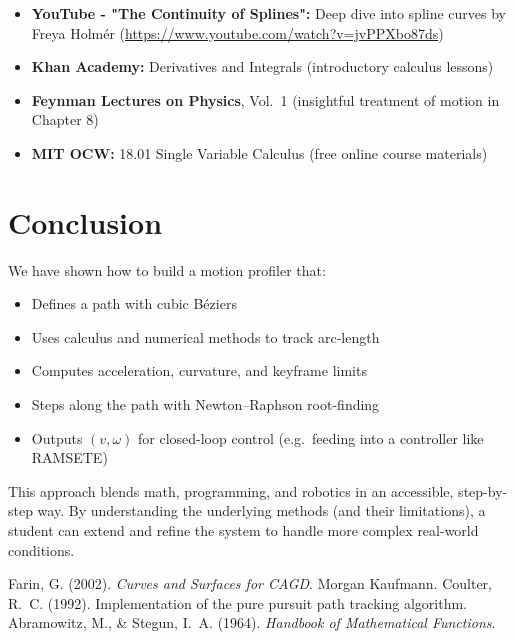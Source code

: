 \documentclass[11pt]{article}
\begin{document}
\begin{itemize}
  \item \textbf{YouTube - "The Continuity of Splines":} Deep dive into spline curves by Freya Holmér (\url{https://www.youtube.com/watch?v=jvPPXbo87ds})
  \item \textbf{Khan Academy:} Derivatives and Integrals (introductory calculus lessons)
  \item \textbf{Feynman Lectures on Physics}, Vol.~1 (insightful treatment of motion in Chapter 8)
  \item \textbf{MIT OCW:} 18.01 Single Variable Calculus (free online course materials)
\end{itemize}

\section{Conclusion}

We have shown how to build a motion profiler that:
\begin{itemize}
  \item Defines a path with cubic Béziers
  \item Uses calculus and numerical methods to track arc‐length
  \item Computes acceleration, curvature, and keyframe limits
  \item Steps along the path with Newton–Raphson root-finding
  \item Outputs \((v,\omega)\) for closed-loop control (e.g.\ feeding into a controller like RAMSETE)
\end{itemize}

This approach blends math, programming, and robotics in an accessible, step-by-step way. By understanding the underlying methods (and their limitations), a student can extend and refine the system to handle more complex real-world conditions.

\newpage

\begin{thebibliography}{9}
Farin, G. (2002). \emph{Curves and Surfaces for CAGD}. Morgan Kaufmann.
Coulter, R.~C. (1992). Implementation of the pure pursuit path tracking algorithm.
Abramowitz, M., \& Stegun, I.~A. (1964). \emph{Handbook of Mathematical Functions}.
\end{thebibliography}
\end{document}
